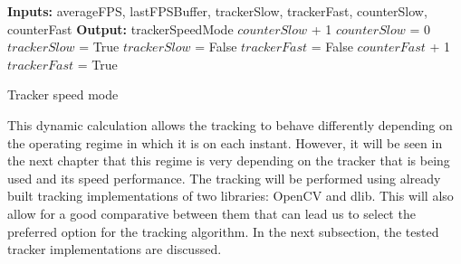 \begin{algorithmic}[H]
\begin{algorithm}
\State \textbf{Inputs:} averageFPS, lastFPSBuffer, trackerSlow, trackerFast, counterSlow, counterFast
\State \textbf{Output:} trackerSpeedMode
    \State $counterSlow$ + 1
        \State $counterSlow$ = 0
        \State $trackerSlow$ = True
    \EndIf
{}
    \State $trackerSlow$ = False
    \State $trackerFast$ = False
    \State $counterFast$ + 1
\State $trackerFast$ = True
\EndIf  
\EndProcedure
\caption{Tracker speed mode}\label{tracker_speed}
\end{algorithm}
\end{algorithmic}

This dynamic calculation allows the tracking to behave differently depending on the operating regime in which it is on each instant. However, it will be seen in the next chapter that this regime is very depending on the tracker that is being used and its speed performance.
The tracking will be performed using already built tracking implementations of two libraries: OpenCV and dlib. This will also allow for a good comparative between them that can lead us to select the preferred option for the tracking algorithm. In the next subsection, the tested tracker implementations are discussed.
